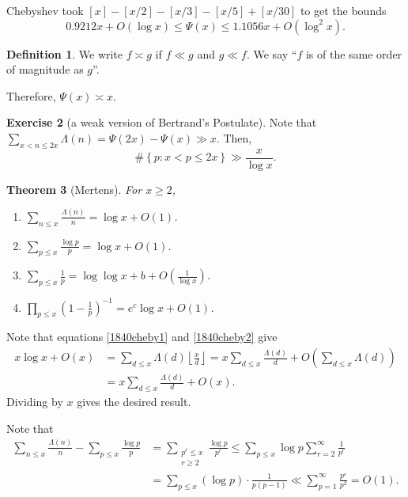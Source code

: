 \documentclass[11pt]{article}
\newtheorem{thm}{Theorem}[subsection]
\theoremstyle{definition}
\newtheorem{defn}[thm]{Definition}
\newtheorem{exe}[thm]{Exercise}
\newcommand{\set}[1]{\left\{ #1 \right\}}
\newcommand{\floor}[1]{\left\lfloor #1 \right\rfloor}
\newcommand{\e}[0]{\varepsilon}
\newcommand{\La}[0]{\Lambda}
\begin{document}
Chebyshev took $[x]-[x/2]-[x/3]-[x/5]+[x/30]$ to get the bounds
\[
0.9212x + O(\log x) \le \Psi(x) \le 1.1056x + O(\log^2 x) .
\]

\begin{defn}
We write $f\asymp g$ if $f\ll g$ and $g\ll f$. We say ``$f$ is of the same order of
magnitude as $g$''.
\end{defn}

Therefore, $\Psi(x) \asymp x$.

\begin{exe}[a weak version of Bertrand's Postulate]
Note that $\sum_{x<n\le 2x}\La(n) = \Psi(2x)-\Psi(x)\gg x$. Then,
\[
\#\set{p:x<p\le 2x} \gg \frac{x}{\log x} .
\]
\end{exe}

\begin{thm}[Mertens] \label{thm:2.7}
For $x\ge2$,
\begin{enumerate}
\item $\sum_{n\le x}\frac{\La(n)}{n} = \log x + O(1)$.
\item $\sum_{p\le x}\frac{\log p}{p} = \log x + O(1)$.
\item $\sum_{p\le x}\frac1p = \log\log x + b + O\left(\frac1{\log x}\right)$.
\item $\prod_{p\le x}\left(1-\frac1p\right)^{-1} = e^c\log x + O(1)$.
\end{enumerate}
\end{thm}

\proof[Proof of (a)]
Note that equations \ref{1840cheby1} and \ref{1840cheby2} give
\begin{align*}
x\log x + O(x) &= \sum_{d\le x}\La(d)\floor{\frac{x}d}
= x\sum_{d\le x}\frac{\La(d)}d + O\left(\sum_{d\le x}\La(d)\right) \\
&= x\sum_{d\le x}\frac{\La(d)}d + O(x) .
\end{align*}
Dividing by $x$ gives the desired result.
\qedhere

\proof[Proof of (b)]
Note that
\begin{align*}
\sum_{n\le x}\frac{\La(n)}n - \sum_{p\le x} \frac{\log p}p
&= \sum_{\substack{p^r\le x\\r\ge2}} \frac{\log p}{p^r}
\le \sum_{p\le x} \log p \sum_{r=2}^\infty \frac1{p^r} \\
&= \sum_{p\le x}(\log p)\cdot\frac{1}{p(p-1)}
\ll \sum_{p=1}^\infty \frac{p^\e}{p^2} = O(1) .
\end{align*}
\qedhere

\end{document}
